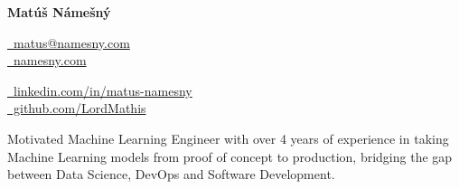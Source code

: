 \documentclass[a4paper,12pt]{article}
\begin{document}
\begin{center}
{\Huge\bfseries\filcenter Matúš Námešný}
\end{center}

\begin{center}
\begin{minipage}{0.45\textwidth}
  \begin{flushleft}
    \href{mailto:matus@namesny.com}{\faEnvelope\ matus@namesny.com} \\[4pt]
    \href{https://namesny.com}{\faGlobe\ namesny.com}
  \end{flushleft}
\end{minipage}
\hfill
\begin{minipage}{0.45\textwidth}
  \begin{flushleft}
    \href{https://www.linkedin.com/in/matus-namesny/}{\faLinkedin\ linkedin.com/in/matus-namesny} \\[4pt]
    \href{https://www.github.com/LordMathis}{\faGithub\ github.com/LordMathis}
  \end{flushleft}
\end{minipage}
\end{center}

 \noindent Motivated Machine Learning Engineer with over 4 years of experience in taking Machine Learning models from proof of concept to production, bridging the gap between Data Science, DevOps and Software Development.
\end{document}

